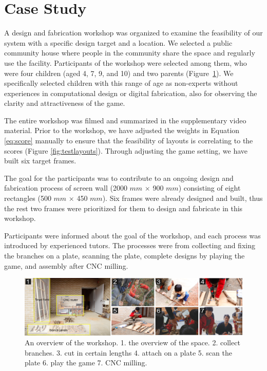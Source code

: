 \section{Case Study}
\label{sec:casestudy}
A design and fabrication workshop was organized to examine the feasibility of our system with a specific design target and a location.
We selected a public community house where people in the community share the space and regularly use the facility.
Participants of the workshop were selected among them, who were four children (aged 4, 7, 9, and 10) and two parents (Figure~\ref{fig:workshop}).
We specifically selected children with this range of age as non-experts without experiences in computational design or digital fabrication, also for observing the clarity and attractiveness of the game.

The entire workshop was filmed and summarized in the supplementary video material.
Prior to the workshop, we have adjusted the weights in Equation \ref{eq:score} manually to ensure that the feasibility of layouts is correlating to the scores (Figure \ref{fig:testlayouts}). 
Through adjusting the game setting, we have built six target frames.

The goal for the participants was to contribute to an ongoing design and fabrication process of screen wall (2000 $mm$ $\times$ 900 $mm$) consisting of eight rectangles (500 $mm$ $\times$ 450 $mm$).
Six frames were already designed and built, thus the rest two frames were prioritized for them to design and fabricate in this workshop.

Participants were informed about the goal of the workshop, and each process was introduced by experienced tutors.
The processes were from collecting and fixing the branches on a plate, scanning the plate, complete designs by playing the game, and assembly after CNC milling.

\begin{figure}[ht]
  \begin{center}
    \includegraphics[width = 0.4\paperwidth]{images/fabrication/workshop_setup.png}
    \caption{An overview of the workshop. 1. the overview of the space. 2. collect branches. 3. cut in certain lengths 4. attach on a plate 5. scan the plate 6. play the game 7. CNC milling.}
    \label{fig:workshop}
  \end{center}
\end{figure}

